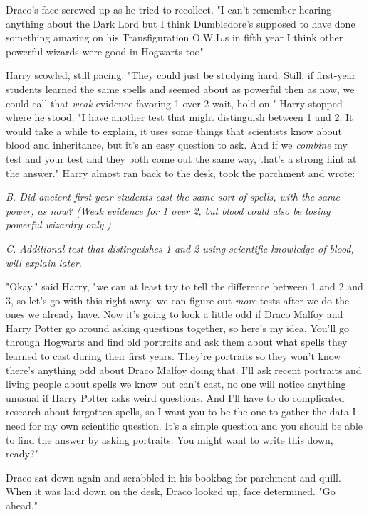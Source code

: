 Draco's face screwed up as he tried to recollect. "I can't remember hearing
anything about the Dark Lord but I think Dumbledore's supposed to have done
something amazing on his Transfiguration O.W.L.s in fifth year{\el} I think
other powerful wizards were good in Hogwarts too{\el}"

Harry scowled, still pacing. "They could just be studying hard. Still, if
first-year students learned the same spells and seemed about as powerful then
as now, we could call that \emph{weak} evidence favoring 1 over 2{\el} wait,
hold on." Harry stopped where he stood. "I have another test that might
distinguish between 1 and 2. It would take a while to explain, it uses some
things that scientists know about blood and inheritance, but it's an easy
question to ask. And if we \emph{combine} my test and your test and they both
come out the same way, that's a strong hint at the answer." Harry almost ran
back to the desk, took the parchment and wrote:

\emph{B. Did ancient first-year students cast the same sort of spells, with the
same power, as now? (Weak evidence for 1 over 2, but blood could also be losing
powerful wizardry only.)}

\emph{C. Additional test that distinguishes 1 and 2 using scientific knowledge
of blood, will explain later.}

"Okay," said Harry, "we can at least try to tell the difference between 1 and 2
and 3, so let's go with this right away, we can figure out \emph{more} tests
after we do the ones we already have. Now it's going to look a little odd if
Draco Malfoy and Harry Potter go around asking questions together, so here's my
idea. You'll go through Hogwarts and find old portraits and ask them about what
spells they learned to cast during their first years. They're portraits so they
won't know there's anything odd about Draco Malfoy doing that. I'll ask recent
portraits and living people about spells we know but can't cast, no one will
notice anything unusual if Harry Potter asks weird questions. And I'll have to
do complicated research about forgotten spells, so I want you to be the one to
gather the data I need for my own scientific question. It's a simple question
and you should be able to find the answer by asking portraits. You might want
to write this down, ready?"

Draco sat down again and scrabbled in his bookbag for parchment and quill. When
it was laid down on the desk, Draco looked up, face determined. "Go ahead."

